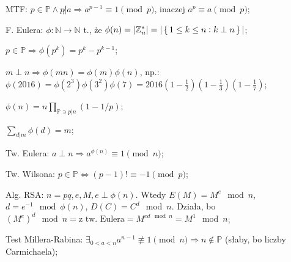 \entry
MTF: ${p\in \mathbb{P} \land p\not | a} \Rightarrow a^{p-1} \equiv 1 \pmod{p}$,
  inaczej $a^p \equiv a \pmod{p}$;

\entry
F. Eulera: $\phi: \mathbb{N} \rightarrow \mathbb{N}$ t., że
  $\phi(n)=|\mathbb{Z}^*_n|=|\set{1\leq k\leq n : k \perp n}|$;

\entry
$p \in \mathbb{P} \Rightarrow \phi(p^k)=p^k-p^{k-1}$;

\entry
$m\perp n \Rightarrow \phi(mn) = \phi(m)\phi(n)$, np.:
  $\phi(2016) = \phi(2^3)\phi(3^2)\phi(7) =
  2016(1-\frac{1}{2})(1-\frac{1}{3})(1-\frac{1}{7})$;

\entry
$\phi(n) = n\prod_{\mathbb{P} \ni p | n}(1- 1/p)$;

\entry
$\sum_{d|m}\phi(d) = m$;

\entry
Tw. Eulera: $a\perp n \Rightarrow a^{\phi(n)} \equiv 1 \pmod{n}$;

\entry
Tw. Wilsona: $p\in\mathbb{P} \Leftrightarrow (p-1)! \equiv -1 \pmod{p}$;

\entry
Alg. RSA: $n=pq, e, M, e \perp \phi(n)$. Wtedy $E(M) = M^e \mod n$,
  $d = e^{-1} \mod \phi(n)$, $D(C) = C^d \mod n$. Działa, bo
  $(M^e)^d \mod n = \text{z tw. Eulera} = M^{ed \mod n} = M^1 \mod n$;

\entry
Test Millera-Rabina: $\exists_{0<a<n}a^{n-1}\not\equiv 1 \pmod{n} \Rightarrow
  n \not\in \mathbb{P}$ (słaby, bo liczby Carmichaela);



